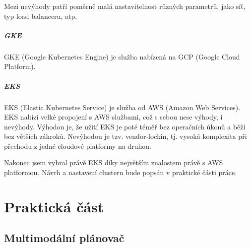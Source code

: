 \documentclass[thesis=M,czech]{FITthesis}[2019/12/23]
\theoremstyle{plain}
\theoremstyle{definition}
\begin{document}
Mezi nevýhody patří poměrně malá nastavitelnost různých parametrů, jako síť, typ load balanceru, atp. 


\paragraph{GKE}

GKE (Google Kubernetes Engine) je služba nabízená na GCP (Google Cloud Platform). 



\paragraph{EKS}

EKS (Elastic Kubernetes Service) je služba od AWS (Amazon Web Services). EKS nabízí velké propojení s AWS službami, což s sebou nese výhody, i nevýhody. Výhodou je, že užití EKS je poté téměř bez operačních úkonů a běží bez větších zákroků. Nevýhodou je tzv. vendor-lockin, tj. vysoká komplexita při přechodu z jedné cloudové platformy na druhou.



Nakonec jsem vybral právě EKS díky největším znalostem právě s AWS platformou. Návrh a nastavení clusteru bude popsán v praktické části práce. 







\chapter{Praktická část}


\section{Multimodální plánovač}
\end{document}
